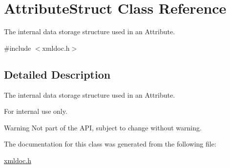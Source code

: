 \hypertarget{classAttributeStruct}{
\section{AttributeStruct Class Reference}
\label{d6/d23/classAttributeStruct}
}


The internal data storage structure used in an Attribute.  




{\ttfamily \#include $<$xmldoc.h$>$}



\subsection{Detailed Description}
The internal data storage structure used in an Attribute. \begin{DoxyInternal}{For internal use only.}
\begin{DoxyWarning}{Warning}
Not part of the API, subject to change without warning. 
\end{DoxyWarning}
\end{DoxyInternal}


The documentation for this class was generated from the following file:\begin{DoxyCompactItemize}
\item 
\hyperlink{xmldoc_8h}{xmldoc.h}\end{DoxyCompactItemize}
